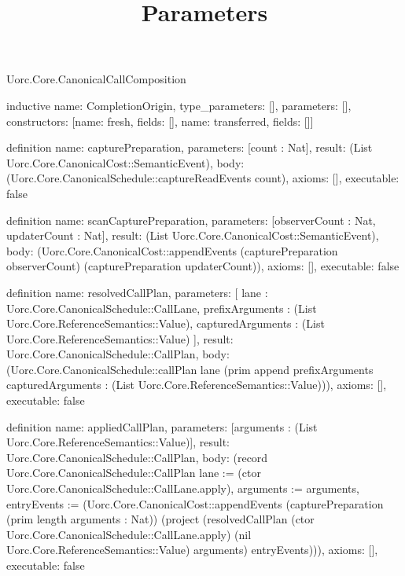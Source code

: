 \begin{lexlean}{Uorc.Core.CanonicalCallComposition}
\title{Parameters}
\begin{semanticmodule}
inductive{
  name: CompletionOrigin,
  type_parameters: [],
  parameters: [],
  constructors: [{name: fresh, fields: []}, {name: transferred, fields: []}]
}

definition{
  name: capturePreparation,
  parameters: [count : Nat],
  result: (List Uorc.Core.CanonicalCost::SemanticEvent),
  body: (Uorc.Core.CanonicalSchedule::captureReadEvents count),
  axioms: [],
  executable: false
}

definition{
  name: scanCapturePreparation,
  parameters: [observerCount : Nat, updaterCount : Nat],
  result: (List Uorc.Core.CanonicalCost::SemanticEvent),
  body: (Uorc.Core.CanonicalCost::appendEvents (capturePreparation observerCount) (capturePreparation updaterCount)),
  axioms: [],
  executable: false
}

definition{
  name: resolvedCallPlan,
  parameters: [
    lane : Uorc.Core.CanonicalSchedule::CallLane,
    prefixArguments : (List Uorc.Core.ReferenceSemantics::Value),
    capturedArguments : (List Uorc.Core.ReferenceSemantics::Value)
  ],
  result: Uorc.Core.CanonicalSchedule::CallPlan,
  body: (Uorc.Core.CanonicalSchedule::callPlan lane (prim append prefixArguments capturedArguments : (List Uorc.Core.ReferenceSemantics::Value))),
  axioms: [],
  executable: false
}

definition{
  name: appliedCallPlan,
  parameters: [arguments : (List Uorc.Core.ReferenceSemantics::Value)],
  result: Uorc.Core.CanonicalSchedule::CallPlan,
  body: (record Uorc.Core.CanonicalSchedule::CallPlan {lane := (ctor Uorc.Core.CanonicalSchedule::CallLane.apply), arguments := arguments, entryEvents := (Uorc.Core.CanonicalCost::appendEvents (capturePreparation (prim length arguments : Nat)) (project (resolvedCallPlan (ctor Uorc.Core.CanonicalSchedule::CallLane.apply) (nil Uorc.Core.ReferenceSemantics::Value) arguments) entryEvents))}),
  axioms: [],
  executable: false
}


\end{semanticmodule}
\end{lexlean}
